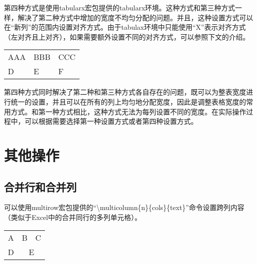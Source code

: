 ﻿\documentclass{article}
\begin{document}
    第四种方式是使用tabularx宏包提供的tabularx环境。这种方式和第三种方式一样，解决了第二种方式中增加的宽度不均匀分配的问题。并且，这种设置方式可以在``新列''的范围内设置对齐方式。由于tabulax环境中只能使用``X''表示对齐方式（左对齐且上对齐），如果需要额外设置不同的对齐方式，可以参照下文的介绍。

    \mbox{}

    \begin{tabularx}{\textwidth}{|>{\raggedright}X|>{\centering}X|>{\raggedleft\arraybackslash}X|}
        AAA&BBB&CCC\\
        D&E&F\\
    \end{tabularx}
    
    \mbox{}

    第四种方式同时解决了第二种和第三种方式各自存在的问题，既可以为整表宽度进行统一的设置，并且可以在所有的列上均匀地分配宽度，因此是调整表格宽度的常用方式。和第一种方式相比，这种方式无法为每列设置不同的宽度。在实际操作过程中，可以根据需要选择第一种设置方式或者第四种设置方式。

\section{其他操作}
\subsection{合并行和合并列}
    可以使用multirow宏包提供的``\textbackslash multicolumn\{n\}\{cols\}\{text\}''命令设置跨列内容（类似于Excel中的合并同行的多列单元格）。

    \mbox{}

    \begin{tabular}{ll|l} %
        A&B&C\\
        D&\multicolumn{2}{|c}{E}\\ 
    \end{tabular}
\end{document}

